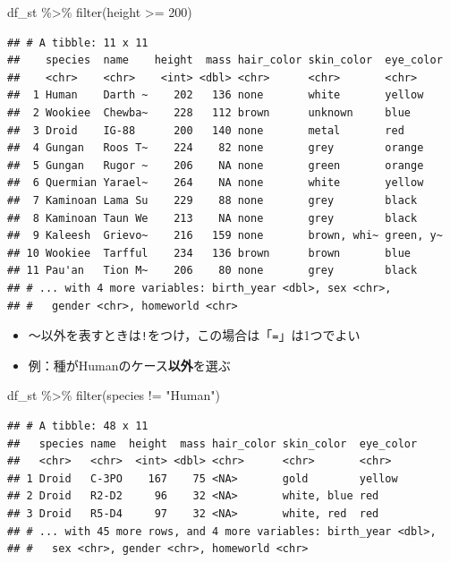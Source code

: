 \documentclass[
  xelatex,ja=standard, b5paper]{bxjsbook}
\newenvironment{Shaded}{\begin{snugshade}}{\end{snugshade}}
\newcommand{\DecValTok}[1]{\textcolor[rgb]{0.00,0.00,0.81}{#1}}
\newcommand{\FunctionTok}[1]{\textcolor[rgb]{0.00,0.00,0.00}{#1}}
\newcommand{\NormalTok}[1]{#1}
\newcommand{\SpecialCharTok}[1]{\textcolor[rgb]{0.00,0.00,0.00}{#1}}
\newcommand{\StringTok}[1]{\textcolor[rgb]{0.31,0.60,0.02}{#1}}
\providecommand{\tightlist}{%
  \setlength{\itemsep}{0pt}\setlength{\parskip}{0pt}}
\begin{document}
\begin{Shaded}
\begin{Highlighting}[]
\NormalTok{df\_st }\SpecialCharTok{\%\textgreater{}\%} 
  \FunctionTok{filter}\NormalTok{(height }\SpecialCharTok{\textgreater{}=} \DecValTok{200}\NormalTok{)}
\end{Highlighting}
\end{Shaded}

\begin{verbatim}
## # A tibble: 11 x 11
##    species  name    height  mass hair_color skin_color  eye_color
##    <chr>    <chr>    <int> <dbl> <chr>      <chr>       <chr>    
##  1 Human    Darth ~    202   136 none       white       yellow   
##  2 Wookiee  Chewba~    228   112 brown      unknown     blue     
##  3 Droid    IG-88      200   140 none       metal       red      
##  4 Gungan   Roos T~    224    82 none       grey        orange   
##  5 Gungan   Rugor ~    206    NA none       green       orange   
##  6 Quermian Yarael~    264    NA none       white       yellow   
##  7 Kaminoan Lama Su    229    88 none       grey        black    
##  8 Kaminoan Taun We    213    NA none       grey        black    
##  9 Kaleesh  Grievo~    216   159 none       brown, whi~ green, y~
## 10 Wookiee  Tarfful    234   136 brown      brown       blue     
## 11 Pau'an   Tion M~    206    80 none       grey        black    
## # ... with 4 more variables: birth_year <dbl>, sex <chr>,
## #   gender <chr>, homeworld <chr>
\end{verbatim}

\begin{itemize}
\tightlist
\item
  ～以外を表すときは\texttt{!}をつけ，この場合は「\texttt{=}」は1つでよい
\item
  例：種がHumanのケース\textbf{以外}を選ぶ
\end{itemize}

\begin{Shaded}
\begin{Highlighting}[]
\NormalTok{df\_st }\SpecialCharTok{\%\textgreater{}\%} 
  \FunctionTok{filter}\NormalTok{(species }\SpecialCharTok{!=} \StringTok{"Human"}\NormalTok{)}
\end{Highlighting}
\end{Shaded}

\begin{verbatim}
## # A tibble: 48 x 11
##   species name  height  mass hair_color skin_color  eye_color
##   <chr>   <chr>  <int> <dbl> <chr>      <chr>       <chr>    
## 1 Droid   C-3PO    167    75 <NA>       gold        yellow   
## 2 Droid   R2-D2     96    32 <NA>       white, blue red      
## 3 Droid   R5-D4     97    32 <NA>       white, red  red      
## # ... with 45 more rows, and 4 more variables: birth_year <dbl>,
## #   sex <chr>, gender <chr>, homeworld <chr>
\end{verbatim}
\end{document}

